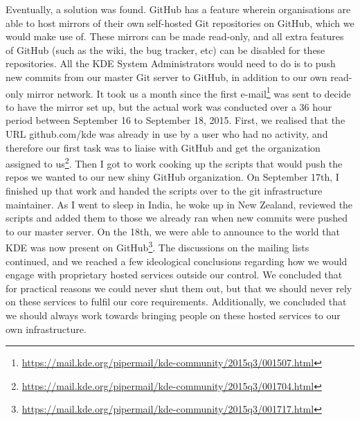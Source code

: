 Eventually, a solution was found. GitHub has a feature wherein organisations are able to host mirrors of their own self-hosted Git repositories on GitHub, which we would make use of. These mirrors can be made read-only, and all extra features of GitHub (such as the wiki, the bug tracker, etc) can be disabled for these repositories. All the KDE System Administrators would need to do is to push new commits from our master Git server to GitHub, in addition to our own read-only mirror network.
It took us a month since the first e-mail\footnote{\url{https://mail.kde.org/pipermail/kde-community/2015q3/001507.html}} was sent to decide to have the mirror set up, but the actual work was conducted over a 36 hour period between September 16 to September 18, 2015. First, we realised that the URL github.com/kde was already in use by a user who had no activity, and therefore our first task was to liaise with GitHub and get the organization assigned to us\footnote{\url{https://mail.kde.org/pipermail/kde-community/2015q3/001704.html}}. Then I got to work cooking up the scripts that would push the repos we wanted to our new shiny GitHub organization. On September 17th, I finished up that work and handed the scripts over to the git infrastructure maintainer. As I went to sleep in India, he woke up in New Zealand, reviewed the scripts and added them to those we already ran when new commits were pushed to our master server. On the 18th, we were able to announce to the world that KDE was now present on GitHub\footnote{\url{https://mail.kde.org/pipermail/kde-community/2015q3/001717.html}}.
The discussions on the mailing lists continued, and we reached a few ideological conclusions regarding how we would engage with proprietary hosted services outside our control. We concluded that for practical reasons we could never shut them out, but that we should never rely on these services to fulfil our core requirements. Additionally, we concluded that we should always work towards bringing people on these hosted services to our own infrastructure.

